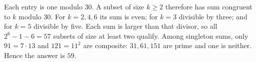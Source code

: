 Each entry is one modulo 30. A subset of size $k\ge2$ therefore has sum congruent to $k$ modulo 30. For $k=2,4,6$ its sum is even; for $k=3$ divisible by three; and for $k=5$ divisible by five. Each sum is larger than that divisor, so all $2^6-1-6=57$ subsets of size at least two qualify. Among singleton sums, only $91=7\cdot13$ and $121=11^2$ are composite: $31,61,151$ are prime and one is neither. Hence the answer is $\boxed{59}$.
